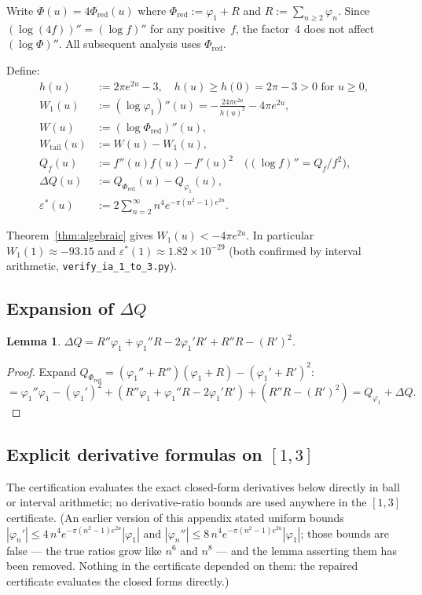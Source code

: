 \documentclass[11pt]{article}
\newtheorem{lemma}[theorem]{Lemma}
\theoremstyle{definition}
\theoremstyle{remark}
\begin{document}
Write $\Phi(u) = 4\Phi_{\mathrm{red}}(u)$ where
$\Phi_{\mathrm{red}} := \varphi_1 + R$ and $R := \sum_{n\geq 2}\varphi_n$.
Since $(\log(4f))'' = (\log f)''$ for any positive~$f$, the factor~4 does not
affect $(\log\Phi)''$.
All subsequent analysis uses $\Phi_{\mathrm{red}}$.

Define:
\begin{align*}
h(u) &:= 2\pi e^{2u} - 3, \quad h(u) \geq h(0) = 2\pi-3 > 0 \text{ for } u\geq 0,\\
W_1(u) &:= (\log\varphi_1)''(u) = -\tfrac{24\pi e^{2u}}{h(u)^2} - 4\pi e^{2u},\\
W(u) &:= (\log\Phi_{\mathrm{red}})''(u),\\
W_{\mathrm{tail}}(u) &:= W(u) - W_1(u),\\
Q_f(u) &:= f''(u)f(u) - f'(u)^2 \quad\bigl((\log f)'' = Q_f/f^2\bigr),\\
\Delta Q(u) &:= Q_{\Phi_{\mathrm{red}}}(u) - Q_{\varphi_1}(u),\\
\varepsilon^*(u) &:= 2\sum_{n=2}^{\infty} n^4 e^{-\pi(n^2-1)e^{2u}}.
\end{align*}

Theorem~\ref{thm:algebraic} gives $W_1(u) < -4\pi e^{2u}$.
In particular $W_1(1) \approx -93.15$ and $\varepsilon^*(1) \approx 1.82\times 10^{-29}$
(both confirmed by interval arithmetic, \texttt{verify\_ia\_1\_to\_3.py}).

\subsection{Expansion of $\Delta Q$}

\begin{lemma}\label{lem:deltaQ}
$\Delta Q = R''\varphi_1 + \varphi_1''R - 2\varphi_1'R' + R''R - (R')^2$.
\end{lemma}

\begin{proof}
Expand $Q_{\Phi_{\mathrm{red}}} = (\varphi_1''+R'')(\varphi_1+R) - (\varphi_1'+R')^2$:
\[
= \varphi_1''\varphi_1 - (\varphi_1')^2
  + (R''\varphi_1 + \varphi_1''R - 2\varphi_1'R')
  + (R''R - (R')^2)
= Q_{\varphi_1} + \Delta Q.
\]
\end{proof}

\subsection{Explicit derivative formulas on $[1,3]$}

The certification evaluates the exact closed-form derivatives below
directly in ball or interval arithmetic; no derivative-ratio bounds are
used anywhere in the $[1,3]$ certificate.
(An earlier version of this appendix stated uniform bounds
$|\varphi_n'| \leq 4\,n^4 e^{-\pi(n^2-1)e^{2u}}|\varphi_1|$ and
$|\varphi_n''| \leq 8\,n^4 e^{-\pi(n^2-1)e^{2u}}|\varphi_1|$; those
bounds are false --- the true ratios grow like $n^6$ and $n^8$ ---
and the lemma asserting them has been removed.  Nothing in the
certificate depended on them: the repaired certificate evaluates the closed
forms directly.)
\end{document}
